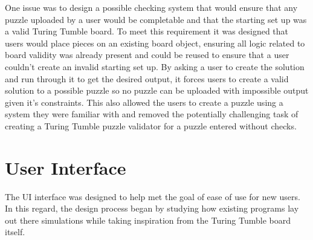 \documentclass{l4proj}
\begin{document}
One issue was to design a possible checking system that would ensure that any puzzle uploaded by a user would be completable and that the starting set up was a valid Turing Tumble board. To meet this requirement it was designed that users would place pieces on an existing board object, ensuring all logic related to board validity was already present and could be reused to ensure that a user couldn't create an invalid starting set up. By asking a user to create the solution and run through it to get the desired output, it forces users to create a valid solution to a possible puzzle so no puzzle can be uploaded with impossible output given it's constraints. This also allowed the users to create a puzzle using a system they were familiar with and removed the potentially challenging task of creating a Turing Tumble puzzle validator for a puzzle entered without checks. 



\section{User Interface}

The UI interface was designed to help met the goal of ease of use for new users. In this regard, the design process began by studying how existing programs lay out there simulations while taking inspiration from the Turing Tumble board itself.
\end{document}
